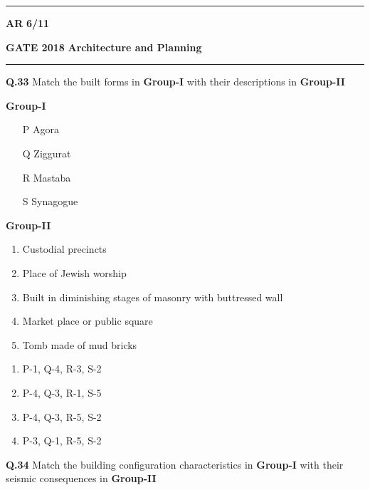\documentclass{article}
\begin{document}
\vspace{2cm}

 \noindent
\hrule \vspace{0.0875CM} \textbf{AR} \hfill  \textbf{6/11}

\newpage

\noindent
\textbf{GATE 2018} \hfill \textbf{Architecture and Planning}
\vspace{0.0012cm} \hrule

\vspace{0.5cm}

\noindent\textbf{Q.33} Match the built forms in \textbf{Group-I} with their descriptions in \textbf{Group-II}

\begin{multicols}{2}
\noindent \hspace{1.5cm}  \textbf  {Group-I}
\begin{enumerate}[label=\Alph*., leftmargin=1.5cm]
    \item[P] Agora
    \item[Q] Ziggurat
    \item[R] Mastaba
    \item[S] Synagogue
\end{enumerate}

\columnbreak

\noindent \hspace{1cm} \textbf{Group-II}
\begin{enumerate}[label=\arabic*., leftmargin=1.5cm]
    \item Custodial precincts
    \item Place of Jewish worship
    \item Built in diminishing stages of masonry with buttressed wall
    \item Market place or public square
    \item Tomb made of mud bricks
\end{enumerate}
\end{multicols}
\vspace{0.15cm}
\begin{multicols}{2}
\begin{enumerate}[label= (\Alph*), leftmargin=1.5cm] 
    \item P-1, Q-4, R-3, S-2
    \item P-4, Q-3, R-1, S-5
    \item P-4, Q-3, R-5, S-2
    \item P-3, Q-1, R-5, S-2
\end{enumerate}
\end{multicols}
\vspace{0.15cm}
\noindent\textbf{Q.34} Match the building configuration characteristics in \textbf{Group-I} with their seismic consequences in \textbf{Group-II}
\end{document}
